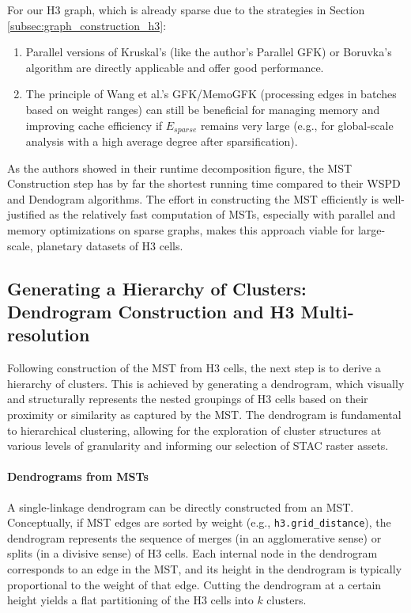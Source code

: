 For our H3 graph, which is already sparse due to the strategies in Section \ref{subsec:graph_construction_h3}:
\begin{enumerate}
    \item Parallel versions of Kruskal's (like the author's Parallel GFK) or Boruvka's algorithm are directly applicable and offer good performance.
    \item The principle of Wang et al.'s GFK/MemoGFK (processing edges in batches based on weight ranges) can still be beneficial for managing memory and improving cache efficiency if $E_{sparse}$ remains very large (e.g., for global-scale analysis with a high average degree after sparsification).
\end{enumerate}
As the authors showed in their runtime decomposition figure, the MST Construction step has by far the shortest running time compared to their WSPD and Dendogram algorithms.
The effort in constructing the MST efficiently is well-justified as the relatively fast computation of MSTs, especially with parallel and memory optimizations on sparse graphs, makes this approach viable for large-scale, planetary datasets of H3 cells.

\subsection{Generating a Hierarchy of Clusters: Dendrogram Construction and H3 Multi-resolution}
\label{subsec:dendrogram_construction}

Following construction of the MST from H3 cells, the next step is to derive a hierarchy of clusters. 
This is achieved by generating a dendrogram, which visually and structurally represents the nested groupings of H3 cells based on their proximity or similarity as captured by the MST. 
The dendrogram is fundamental to hierarchical clustering, allowing for the exploration of cluster structures at various levels of granularity and informing our selection of STAC raster assets.

\paragraph{Dendrograms from MSTs}
A single-linkage dendrogram can be directly constructed from an MST. Conceptually, if MST edges are sorted by weight (e.g., \texttt{h3.grid\_distance}), the dendrogram represents 
the sequence of merges (in an agglomerative sense) or splits (in a divisive sense) of H3 cells. Each internal node in the dendrogram corresponds to an edge in the MST, and 
its height in the dendrogram is typically proportional to the weight of that edge. Cutting the dendrogram at a certain height yields a flat partitioning of the H3 cells into $k$ clusters.

